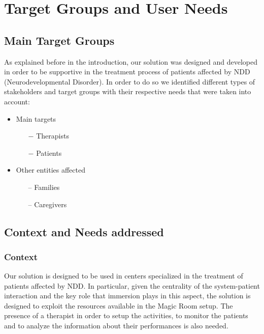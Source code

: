 \chapter{Target Groups and User Needs}
\section{Main Target Groups}
As explained before in the introduction, our solution was designed and developed in order to be supportive in the treatment process of patients affected by NDD (Neurodevelopmental Disorder). In order to do so we identified different types of stakeholders and target groups with their respective needs that were taken into account:
\begin{itemize}
	\item Main targets
	\begin{itemize}
		\item[$ - $] Therapists
		\item[$ - $] Patients
	\end{itemize}
\end{itemize}
\begin{itemize}
		\item Other entities affected
	\begin{itemize}
		\item[--] Families
		\item[--] Caregivers
	\end{itemize}
\end{itemize}

\section{Context and Needs addressed}
	\subsection{Context}
	Our solution is designed to be used in centers specialized in the treatment of patients affected by NDD. In particular, given the centrality of the system-patient interaction and the key role that immersion plays in this aspect, the solution is designed to exploit the resources available in the Magic Room setup. The presence of a therapist in order to setup the activities, to monitor the patients and to analyze the information about their performances is also needed.
	
